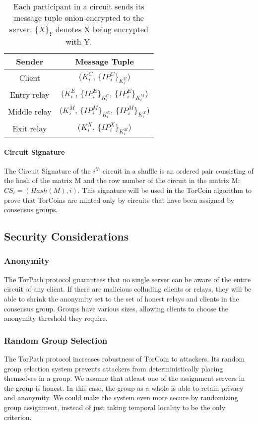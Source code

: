 {\renewcommand{\arraystretch}{2}
\begin{table}[h]
\centering
  \begin{tabular}{ |c || c| }
  \hline
  \textbf{Sender} & \textbf{Message Tuple} \\ \hline
  Client & ($K_{i}^{C}$, $\{IP_{i}^{C}\}_{K_{i}^{E}}$) \\ \hline
  Entry relay & ($K_{i}^{E}$, $\{IP_{i}^{E}\}_{K_{i}^{C}}$, $\{IP_{i}^{E}\}_{K_{i}^{M}}$) \\ \hline
  Middle relay & ($K_{i}^{M}$, $\{IP_{i}^{M}\}_{K_{i}^{E}}$, $\{IP_{i}^{M}\}_{K_{i}^{X}}$) \\ \hline
  Exit relay & ($K_{i}^{X}$, $\{IP_{i}^{X}\}_{K_{i}^{M}}$) \\ \hline
  \end{tabular}
  \caption{Each participant in a circuit sends its message 
  tuple onion-encrypted to the server. $\{X\}_{Y}$ denotes X being encrypted with Y.}
  \label{table:message_format}
\end{table}

\paragraph{Circuit Signature} The Circuit Signature of the $i^{th}$ circuit in
a shuffle is an ordered pair consisting of the hash of the matrix M and the
row number of the circuit in the matrix M: $CS_i = (Hash(M), i)$. This
signature will be used in the TorCoin algorithm to prove that TorCoins are
minted only by circuits that have been assigned by consensus groups.

\subsection{Security Considerations} 

\subsubsection{Anonymity} The TorPath protocol guarantees that no single
server can be aware of the entire circuit of any client. If there are malicious
colluding clients or relays, they will be able to shrink the anonymity set to
the set of honest relays and clients in the consensus group.  Groups have
various sizes, allowing clients to choose the anonymity threshold they
require.

\subsubsection{Random Group Selection} The TorPath protocol increases
robustness of TorCoin to attackers. Its random group selection system prevents
attackers from deterministically placing themselves in a group. We assume that
atleast one of the assignment servers in the group is honest. In this case,
the group as a whole is able to retain privacy and anonymity. We could make
the system even more secure by randomizing group assignment, instead of just
taking temporal locality to be the only criterion.

}
